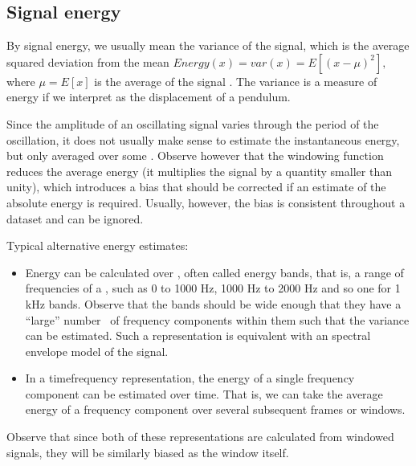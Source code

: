 \documentclass[letterpaper,10pt,english]{jupyterBook}
\begin{document}
\subsection{Signal energy}
\label{\detokenize{Representations/Signal_energy_loudness_and_decibel:signal-energy}}
\sphinxAtStartPar
By signal energy, we usually mean the variance of the signal, which is
the average squared deviation from the mean \(
Energy(x)=var(x)=E[(x-\mu)^2], \) where \( \mu=E[x] \) is the
average of the signal . The variance is a measure of energy if we
interpret  as the displacement of a pendulum.

\sphinxAtStartPar
Since the amplitude of an oscillating signal varies through the period
of the oscillation, it does not usually make sense to estimate the
instantaneous energy, but only averaged over some {\hyperref[\detokenize{Representations/Windowing::doc}]{}}.
Observe however that the windowing function reduces the average energy
(it multiplies the signal by a quantity smaller than unity), which
introduces a bias that should be corrected if an estimate of the
absolute energy is required. Usually, however, the bias is consistent
throughout a dataset and can be ignored.

\sphinxAtStartPar
Typical alternative energy estimates:
\begin{itemize}
\item {} 
\sphinxAtStartPar
Energy can be calculated over , often called energy
bands, that is, a range of frequencies of a {\hyperref[\detokenize{Representations/Spectrogram_and_the_STFT::doc}]{}}, such as 0 to 1000 Hz, 1000 Hz
to 2000 Hz and so one for 1 kHz bands. Observe that the bands should
be wide enough that they have a “large” number  of frequency
components within them such that the variance can be estimated. Such
a representation is equivalent with an spectral envelope model of
the signal.

\item {} 
\sphinxAtStartPar
In a time\sphinxhyphen{}frequency representation, the energy of a single frequency
component can be estimated over time. That is, we can take the
average energy of a frequency component over several subsequent
frames or windows.

\end{itemize}

\sphinxAtStartPar
Observe that since both of these representations are calculated from
windowed signals, they will be similarly biased as the window itself.
\end{document}
